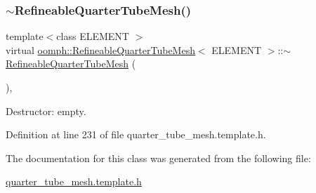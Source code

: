 \subsubsection{\texorpdfstring{$\sim$\+Refineable\+Quarter\+Tube\+Mesh()}{~RefineableQuarterTubeMesh()}}
{\footnotesize\ttfamily template$<$class E\+L\+E\+M\+E\+NT $>$ \\
virtual \hyperlink{classoomph_1_1RefineableQuarterTubeMesh}{oomph\+::\+Refineable\+Quarter\+Tube\+Mesh}$<$ E\+L\+E\+M\+E\+NT $>$\+::$\sim$\hyperlink{classoomph_1_1RefineableQuarterTubeMesh}{Refineable\+Quarter\+Tube\+Mesh} (\begin{DoxyParamCaption}{ }\end{DoxyParamCaption})\hspace{0.3cm}{\ttfamily [inline]}, {\ttfamily [virtual]}}



Destructor\+: empty. 



Definition at line 231 of file quarter\+\_\+tube\+\_\+mesh.\+template.\+h.



The documentation for this class was generated from the following file\+:\begin{DoxyCompactItemize}
\item 
\hyperlink{quarter__tube__mesh_8template_8h}{quarter\+\_\+tube\+\_\+mesh.\+template.\+h}\end{DoxyCompactItemize}
